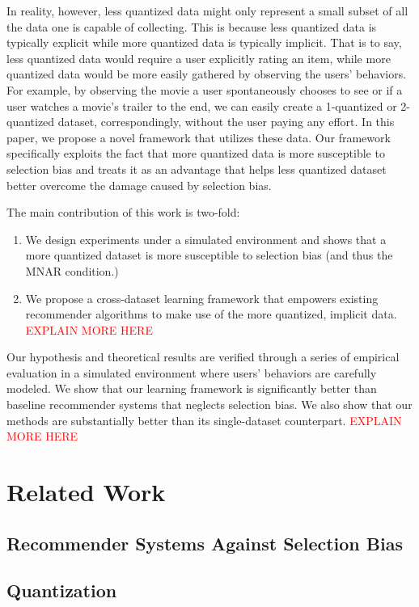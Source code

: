 \documentclass{article}
\begin{document}
In reality, however, less quantized data might only represent a small subset of all the data one is capable of collecting. This is because less quantized data is typically explicit while more quantized data is typically implicit. That is to say, less quantized data would require a user explicitly rating an item, while more quantized data would be more easily gathered by observing the users' behaviors. For example, by observing the movie a user spontaneously chooses to see or if a user watches a movie's trailer to the end, we can easily create a 1-quantized or 2-quantized dataset, correspondingly, without the user paying any effort. In this paper, we propose a novel framework that utilizes these data. Our framework specifically exploits the fact that more quantized data is more susceptible to selection bias and treats it as an advantage that helps less quantized dataset better overcome the damage caused by selection bias.

The main contribution of this work is two-fold:
\begin{enumerate}
  \item We design experiments under a simulated environment and shows that a more quantized dataset is more susceptible to selection bias (and thus the MNAR condition.)
  \item We propose a cross-dataset learning framework that empowers existing recommender algorithms to make use of the more quantized, implicit data. \textcolor{red}{EXPLAIN MORE HERE}
\end{enumerate}

Our hypothesis and theoretical results are verified through a series of empirical evaluation in a simulated environment where users' behaviors are carefully modeled. We show that our learning framework is significantly better than baseline recommender systems that neglects selection bias. We also show that our methods are substantially better than its single-dataset counterpart. \textcolor{red}{EXPLAIN MORE HERE} 

\section{Related Work}

\subsection{Recommender Systems Against Selection Bias}

\subsection{Quantization}
\end{document}
